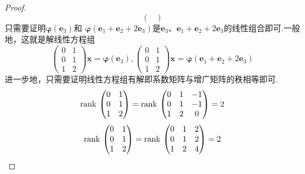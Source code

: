 {\begin{proof}
\[\begin{pmatrix}
            \end{pmatrix}
        \]
        只需要证明$\bm{\varphi}\left(\bm{e}_3\right)$和
        $\bm{\varphi}\left(\bm{e}_1+\bm{e}_2+2
            \bm{e}_3\right)$是$\bm{e}_3$、$\bm{e}_1
            +\bm{e}_2+2\bm{e}_3$的线性组合即可.一般地，这就是解线性方程组
        \[
            \begin{pmatrix}
                0 & 1 \\0&1\\1 & 2
            \end{pmatrix}\bm{x}=\bm{\varphi}\left(\bm{e}_3\right)
            ,
            \begin{pmatrix}
                0 & 1 \\0&1\\1 & 2
            \end{pmatrix}\bm{x}=\bm{\varphi}\left(\bm{e}_1+\bm{e}_2+2\bm{e}_3\right)
        \]
        进一步地，只需要证明线性方程组有解即系数矩阵与增广矩阵的秩相等即可.
        \[
            \operatorname{rank\,} \begin{pmatrix}
                0 & 1 \\0&1\\1 & 2
            \end{pmatrix}=\operatorname{rank\,} \begin{pmatrix}
                0 & 1 & -1 \\0&1&-1\\1 & 2 & 0
            \end{pmatrix}=2
        \]
        \[
            \operatorname{rank\,} \begin{pmatrix}
                0 & 1 \\0&1\\1 & 2
            \end{pmatrix}=\operatorname{rank\,} \begin{pmatrix}
                0 & 1 & 2 \\0&1&2\\1 & 2 & 4
            \end{pmatrix}=2
            \qedhere
        \]
    \end{proof}
}
